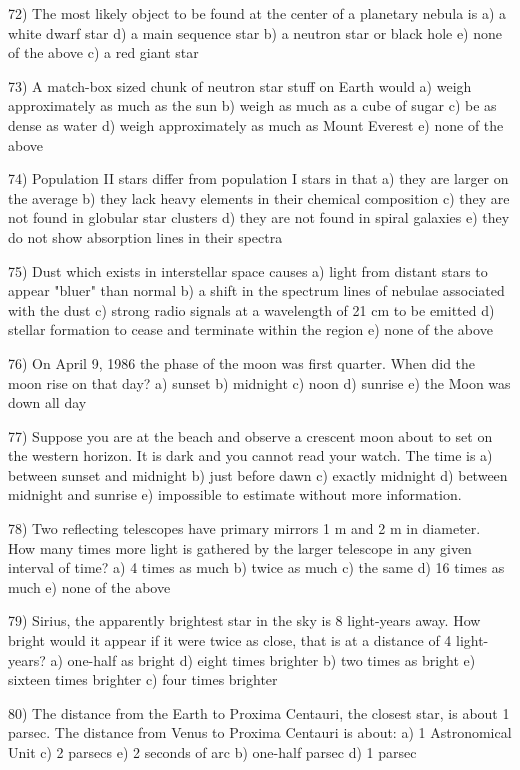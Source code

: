 72) The most likely object to be found at the center of a planetary nebula is
a) a white dwarf star d) a main sequence star
b) a neutron star or black hole e) none of the above
c) a red giant star

73) A match-box sized chunk of neutron star stuff on Earth would
a) weigh approximately as much as the sun
b) weigh as much as a cube of sugar
c) be as dense as water
d) weigh approximately as much as Mount Everest
e) none of the above

74) Population II stars differ from population I stars in that
a) they are larger on the average
b) they lack heavy elements in their chemical composition
c) they are not found in globular star clusters
d) they are not found in spiral galaxies
e) they do not show absorption lines in their spectra

75) Dust which exists in interstellar space causes
a) light from distant stars to appear "bluer" than normal
b) a shift in the spectrum lines of nebulae associated with the dust
c) strong radio signals at a wavelength of 21 cm to be emitted
d) stellar formation to cease and terminate within the region
e) none of the above

76) On April 9, 1986 the phase of the moon was first quarter.
When did the moon rise on that day?
a) sunset b) midnight c) noon d) sunrise
e) the Moon was down all day

77) Suppose you are at the beach and observe a crescent moon about to set
on the western horizon. It is dark and you cannot read your watch.
The time is
a) between sunset and midnight b) just before dawn
c) exactly midnight d) between midnight and sunrise
e) impossible to estimate without more information.

78) Two reflecting telescopes have primary mirrors 1 m and 2 m in diameter.
How many times more light is gathered by the larger telescope in any
given interval of time?
a) 4 times as much b) twice as much c) the same d) 16 times as much
e) none of the above

79) Sirius, the apparently brightest star in the sky is 8 light-years away.
How bright would it appear if it were twice as close, that is at a distance
of 4 light-years?
a) one-half as bright d) eight times brighter
b) two times as bright e) sixteen times brighter
c) four times brighter

80) The distance from the Earth to Proxima Centauri, the closest star, is about
1 parsec. The distance from Venus to Proxima Centauri is about:
a) 1 Astronomical Unit c) 2 parsecs e) 2 seconds of arc
b) one-half parsec d) 1 parsec

